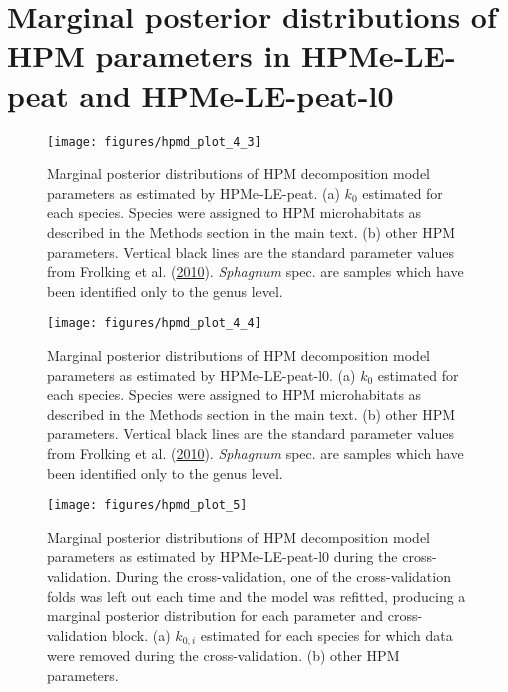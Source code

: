 \documentclass[
  12pt,
]{article}
\begin{document}
\hypertarget{sup-5}{%
\section{Marginal posterior distributions of HPM parameters in HPMe-LE-peat and HPMe-LE-peat-l0}\label{sup-5}}



\begin{figure}[H]

{\centering \texttt{[image: figures/hpmd\_plot\_4\_3]} 

}

\caption{Marginal posterior distributions of HPM decomposition model parameters as estimated by HPMe-LE-peat. (a) \(k_0\) estimated for each species. Species were assigned to HPM microhabitats as described in the Methods section in the main text. (b) other HPM parameters. Vertical black lines are the standard parameter values from Frolking et al. (\protect\hyperlink{ref-Frolking.2010}{2010}). \emph{Sphagnum} spec. are samples which have been identified only to the genus level.}\label{fig:sup-hpmd-plot-4-3}
\end{figure}



\begin{figure}[H]

{\centering \texttt{[image: figures/hpmd\_plot\_4\_4]} 

}

\caption{Marginal posterior distributions of HPM decomposition model parameters as estimated by HPMe-LE-peat-l0. (a) \(k_0\) estimated for each species. Species were assigned to HPM microhabitats as described in the Methods section in the main text. (b) other HPM parameters. Vertical black lines are the standard parameter values from Frolking et al. (\protect\hyperlink{ref-Frolking.2010}{2010}). \emph{Sphagnum} spec. are samples which have been identified only to the genus level.}\label{fig:sup-hpmd-plot-4-4}
\end{figure}



\begin{figure}[H]

{\centering \texttt{[image: figures/hpmd\_plot\_5]} 

}

\caption{Marginal posterior distributions of HPM decomposition model parameters as estimated by HPMe-LE-peat-l0 during the cross-validation. During the cross-validation, one of the cross-validation folds was left out each time and the model was refitted, producing a marginal posterior distribution for each parameter and cross-validation block. (a) \(k_{0,i}\) estimated for each species for which data were removed during the cross-validation. (b) other HPM parameters.}\label{fig:sup-hpmd-plot-5}
\end{figure}
\end{document}
